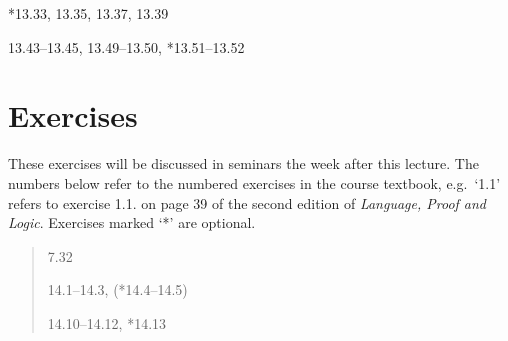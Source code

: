 \documentclass[12pt]{extarticle}
\begin{document}
\begin{multicols*}{3}
\hspace{5mm} *13.33, 13.35, 13.37, 13.39
 
\hspace{5mm} 13.43--13.45, 13.49--13.50, *13.51--13.52
 
\vfill
\begin{minipage}{\columnwidth}
\section{Exercises}
These exercises will be discussed in seminars the week after this lecture.
The numbers below refer to the numbered exercises in the course textbook, e.g.\ `1.1' refers to exercise 1.1. on page 39 of the second edition of \emph{Language, Proof and Logic}. Exercises marked `*' are optional.
 
\begin{quote}
7.32
 
14.1--14.3, (*14.4--14.5)
 
14.10--14.12, *14.13
 
\end{quote}
\end{minipage}


 


\end{multicols*}
\end{document}
